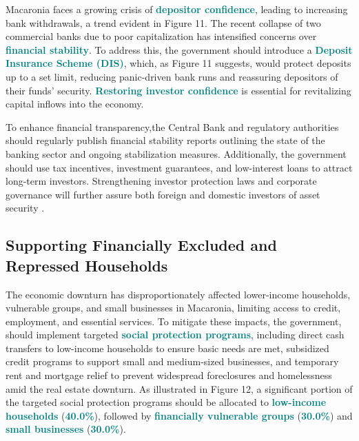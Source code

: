 Macaronia faces a growing crisis of \textcolor{teal}{\textbf{depositor confidence}}, leading 
to increasing bank withdrawals, a trend evident in Figure 11. The recent collapse of two commercial
banks due to poor capitalization has intensified concerns over \textcolor{teal}{\textbf{financial stability}}.
To address this, the government should introduce a \textcolor{teal}{\textbf{Deposit Insurance Scheme (DIS)}},
which, as Figure 11 suggests, would protect deposits up to a set limit, reducing panic-driven bank runs and 
reassuring depositors of their funds' security. \textcolor{teal}{\textbf{Restoring investor confidence}} is
essential for revitalizing capital inflows into the economy.

To enhance financial transparency,the Central Bank and regulatory authorities 
should regularly publish financial stability reports outlining the state of the
banking sector and ongoing stabilization measures. Additionally, the government
should use tax incentives, investment guarantees, and low-interest loans to attract 
long-term investors. Strengthening investor protection laws and corporate governance will 
further assure both foreign and domestic investors of asset security \textcolor{orange}{\cite{gorton2012}}.

\subsection*{Supporting Financially Excluded and Repressed Households}

The economic downturn has disproportionately affected lower-income households, vulnerable groups, 
and small businesses in Macaronia, limiting access to credit, employment, and essential services.
To mitigate these impacts, the government, should implement targeted 
\textcolor{teal}{\textbf{social protection programs}}, including direct cash transfers to low-income 
households to ensure basic needs are met, subsidized credit programs to support small and medium-sized
businesses, and temporary rent and mortgage relief to prevent widespread foreclosures and homelessness
amid the real estate downturn. As illustrated in Figure 12, a significant portion of the targeted social 
protection programs should be allocated to \textcolor{teal}{\textbf{low-income households}}
(\textcolor{teal}{\textbf{40.0\%}}), followed by \textcolor{teal}{\textbf{financially vulnerable groups}} 
(\textcolor{teal}{\textbf{30.0\%}}) and \textcolor{teal}{\textbf{small businesses}}
(\textcolor{teal}{\textbf{30.0\%}}).


